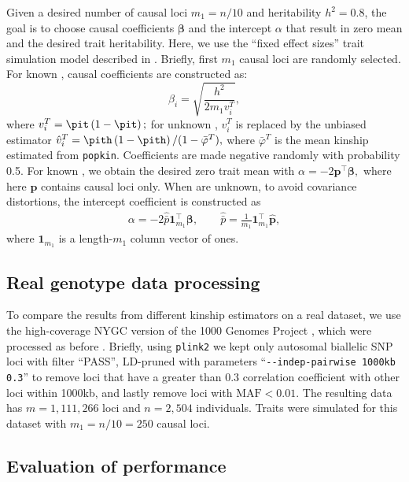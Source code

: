 \documentclass[11pt]{article}
\begin{document}
Given a desired number of causal loci $m_1 = n/10$ and heritability $h^2=0.8$, the goal is to choose causal coefficients $\boldsymbol{\beta}$ and the intercept $\alpha$ that result in zero mean and the desired trait heritability.
Here, we use the ``fixed effect sizes'' trait simulation model described in \citep{yao_limitations_2022}.
Briefly, first $m_1$ causal loci are randomly selected.
For known \pit, causal coefficients are constructed as:
$$
\beta_i = \sqrt{ \frac{h^2}{ 2 m_1 v_i^T } },
$$
where
$
v_i^T
=
\pit \left( 1 - \pit \right)
;
$
for unknown \pit,  $v_i^T$ is replaced by the unbiased estimator
$
\hat{v}_i^T
=
\pith \left( 1 - \pith \right) / ( 1 - \bar{\varphi}^T )
,
$
where $\bar{\varphi}^T$ is the mean kinship estimated from \texttt{popkin}.
Coefficients are made negative randomly with probability 0.5.
For known \pit, we obtain the desired zero trait mean with
$
\alpha 
=
- 2 \mathbf{p}^\intercal \boldsymbol{\beta}
,
$
where here $\mathbf{p}$ contains causal loci only.
When \pit are unknown, to avoid covariance distortions, the intercept coefficient is constructed as
\begin{align*}
  \alpha 
  =
  - 2 \hat{\bar{p}} \mathbf{1}_{m_1}^\intercal \boldsymbol{\beta}
  , \quad\quad
  \hat{\bar{p}}
  =
  \frac{1}{m_1} \mathbf{1}_{m_1}^\intercal \mathbf{\hat{p}}
  ,
\end{align*}
where $\mathbf{1}_{m_1}$ is a length-$m_1$ column vector of ones.

\subsection{Real genotype data processing}

To compare the results from different kinship estimators on a real dataset, we use the high-coverage NYGC version of the 1000 Genomes Project \citep{fairley_international_2020}, which were processed as before \citep{yao_limitations_2022}.
Briefly, using \texttt{plink2} \citep{chang_second-generation_2015} we kept only autosomal biallelic SNP loci with filter ``PASS'', LD-pruned with parameters ``\texttt{-{}-indep-pairwise 1000kb 0.3}'' to remove loci that have a greater than 0.3 correlation coefficient with other loci within 1000kb, and lastly remove loci with $\text{MAF} < 0.01$.
The resulting data has $m=1,111,266$ loci and $n=2,504$ individuals.
Traits were simulated for this dataset with $m_1 = n/10 = 250$ causal loci.

\subsection{Evaluation of performance}
\end{document}
